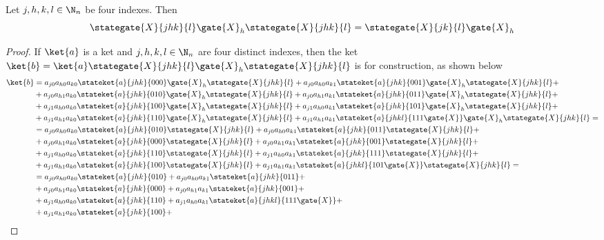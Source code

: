 \documentclass[sigconf,natbib=false]{acmart}
\begin{document}
\begin{proposition}
	Let $j,h,k,l \in \N_n$ be four indexes.
Then
\begin{equation}
\label{eq:mainresult}
\stategate{X}{jhk}{l}\gate{X}_h\stategate{X}{jhk}{l} = \stategate{X}{jk}{l}\gate{X}_h
\end{equation}
\end{proposition}
\begin{proof}
	If $\ket{a}$ is a ket and $j,h,k,l \in \N_n$ are four distinct indexes, then
the ket
$\ket{b}=\ket{a}\stategate{X}{jhk}{l}\gate{X}_h\stategate{X}{jhk}{l}$
is for construction, as shown below
\begin{align*}
\ket{b}
		&=a_{j0}a_{h0}a_{k0}\stateket{a}{jhk}{000}\gate{X}_h\stategate{X}{jhk}{l} +
		a_{j0}a_{h0}a_{k1}\stateket{a}{jhk}{001}\gate{X}_h\stategate{X}{jhk}{l}+\\
		&+a_{j0}a_{h1}a_{k0}\stateket{a}{jhk}{010}\gate{X}_h\stategate{X}{jhk}{l} +
		a_{j0}a_{h1}a_{k1}\stateket{a}{jhk}{011}\gate{X}_h\stategate{X}{jhk}{l}+\\
		&+a_{j1}a_{h0}a_{k0}\stateket{a}{jhk}{100}\gate{X}_h\stategate{X}{jhk}{l} +
		a_{j1}a_{h0}a_{k1}\stateket{a}{jhk}{101}\gate{X}_h\stategate{X}{jhk}{l}+\\
		&+a_{j1}a_{h1}a_{k0}\stateket{a}{jhk}{110}\gate{X}_h\stategate{X}{jhk}{l} +
		a_{j1}a_{h1}a_{k1}\stateket{a}{jhkl}{111\gate{X}}\gate{X}_h\stategate{X}{jhk}{l}=\\
		&=a_{j0}a_{h0}a_{k0}\stateket{a}{jhk}{010}\stategate{X}{jhk}{l} +
		a_{j0}a_{h0}a_{k1}\stateket{a}{jhk}{011}\stategate{X}{jhk}{l}+\\
		&+a_{j0}a_{h1}a_{k0}\stateket{a}{jhk}{000}\stategate{X}{jhk}{l} +
		a_{j0}a_{h1}a_{k1}\stateket{a}{jhk}{001}\stategate{X}{jhk}{l}+\\
		&+a_{j1}a_{h0}a_{k0}\stateket{a}{jhk}{110}\stategate{X}{jhk}{l} +
		a_{j1}a_{h0}a_{k1}\stateket{a}{jhk}{111}\stategate{X}{jhk}{l}+\\
		&+a_{j1}a_{h1}a_{k0}\stateket{a}{jhk}{100}\stategate{X}{jhk}{l} +
		a_{j1}a_{h1}a_{k1}\stateket{a}{jhkl}{101\gate{X}}\stategate{X}{jhk}{l}=\\
		&=a_{j0}a_{h0}a_{k0}\stateket{a}{jhk}{010} +
		a_{j0}a_{h0}a_{k1}\stateket{a}{jhk}{011}+\\
		&+a_{j0}a_{h1}a_{k0}\stateket{a}{jhk}{000} +
		a_{j0}a_{h1}a_{k1}\stateket{a}{jhk}{001}+\\
		&+a_{j1}a_{h0}a_{k0}\stateket{a}{jhk}{110} +
		a_{j1}a_{h0}a_{k1}\stateket{a}{jhkl}{111\gate{X}}+\\
		&+a_{j1}a_{h1}a_{k0}\stateket{a}{jhk}{100} +

\end{align*}
\end{proof}
\end{document}
